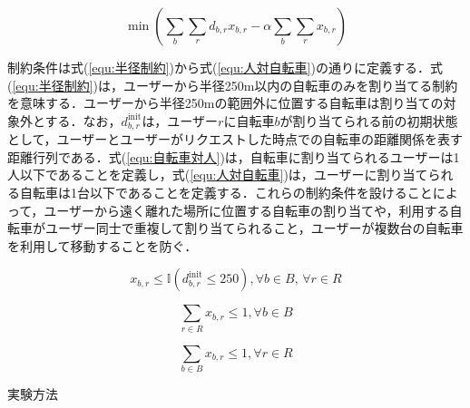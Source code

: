 \documentclass[a4j, 10pt, twocolumn]{ltjarticle}  %
\makeatletter
\renewcommand{\section}{\@startsection{section}{1}{\z@}
   {1.5\Cvs \@plus.5\Cvs \@minus.2\Cvs}
   {.5\Cvs \@plus.3\Cvs}
   {\reset@font\large\bfseries}}  %
\makeatother
\begin{document}
        \vspace{-6mm}
        
        \begin{equation}\label{equ:目的関数}
          \min \left( \sum_{b}\sum_{r}d_{b,r}x_{b,r} - \alpha\sum_{b}\sum_{r}x_{b,r} \right)
        \end{equation}

        \par 制約条件は式(\ref{equ:半径制約})から式(\ref{equ:人対自転車})の通りに定義する．式(\ref{equ:半径制約})は，ユーザーから半径250m以内の自転車のみを割り当てる制約を意味する．ユーザーから半径250mの範囲外に位置する自転車は割り当ての対象外とする．なお，$d^{\text{init}}_{b,r}$は，ユーザー$r$に自転車$b$が割り当てられる前の初期状態として，ユーザーとユーザーがリクエストした時点での自転車の距離関係を表す距離行列である．式(\ref{equ:自転車対人})は，自転車に割り当てられるユーザーは1人以下であることを定義し，式(\ref{equ:人対自転車})は，ユーザーに割り当てられる自転車は1台以下であることを定義する．これらの制約条件を設けることによって，ユーザーから遠く離れた場所に位置する自転車の割り当てや，利用する自転車がユーザー同士で重複して割り当てられること，ユーザーが複数台の自転車を利用して移動することを防ぐ．

        \vspace{-2mm}
        
        \begin{equation}\label{equ:半径制約}
        x_{b, r} \leq \mathbb{I}(d^{\text{init}}_{b, r} \leq 250), \forall b \in B, \, \forall r \in R
      \end{equation}

      \vspace{-2mm}
      
      \begin{equation}\label{equ:自転車対人}
        \sum_{r \in R}x_{b,r} \leq 1, \forall b \in B
      \end{equation}

      \vspace{-2mm}
      
      \begin{equation}\label{equ:人対自転車}
        \sum_{b \in B}x_{b,r} \leq 1, \forall r \in R
      \end{equation}

    \vspace{-5mm}

    \section{実験方法}
        \label{sec:実験方法}
        \vspace{-3mm}
\end{document}
